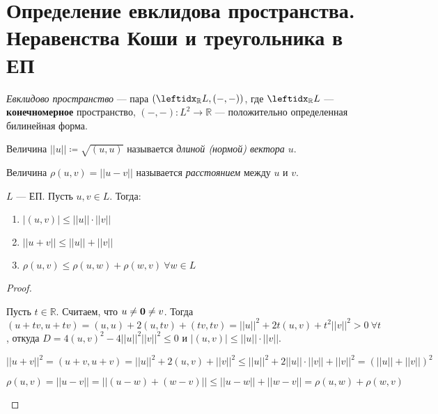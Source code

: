 \section{Определение евклидова пространства. Неравенства Коши и треугольника в ЕП}

\begin{defn}
    \textit{Евклидово пространство} --- пара $(\lsub{\mathbb{R}}{L}, (-, -))$, где $\lsub{\mathbb{R}}{L}$ --- \textbf{конечномерное} пространство, $(-, -) \colon L^2 \to \mathbb{R}$ --- положительно определенная билинейная форма.
    
    Величина $||u|| \coloneqq \sqrt{(u, u)}$ называется \textit{длиной (нормой) вектора $u$}.
    
    Величина $\rho(u, v) = ||u - v||$ называется \textit{расстоянием} между $u$ и $v$.
\end{defn}

\begin{thm*}
    $L$ --- ЕП. Пусть $u, v \in L$. Тогда:
    \begin{enumerate}
        \item $|(u, v)| \le ||u|| \cdot ||v||$
        \item $||u + v|| \le ||u|| + ||v||$
        \item $\rho(u, v) \le \rho(u, w) + \rho(w, v)\ \forall w \in L$
    \end{enumerate}
\end{thm*}

\begin{proof}
    \begin{proofpart}
        Пусть $t \in \mathbb{R}$. Считаем, что $u \neq \mathbf{0} \neq v$. Тогда $(u + tv, u + tv) = (u, u) + 2(u, tv) + (tv, tv) = {||u||}^2 + 2t(u, v) + t^2{||v||}^2 > 0\ \forall t$, откуда $D = 4(u, v)^2 - 4{||u||}^2{||v||}^2 \le 0$ и $|(u, v)| \le ||u|| \cdot ||v||$.
    \end{proofpart}

    \begin{proofpart}
        ${||u + v||}^2 = (u + v, u + v) = {||u||}^2 + 2(u, v) + {||v||}^2 \le {||u||}^2 + 2||u|| \cdot ||v|| + {||v||}^2 = (||u|| + ||v||)^2$
    \end{proofpart}

    \begin{proofpart}
        $\rho(u, v) = ||u - v|| = ||(u - w) + (w - v)|| \le ||u - w|| + ||w - v|| = \rho(u, w) + \rho(w, v)$
    \end{proofpart}
\end{proof}
